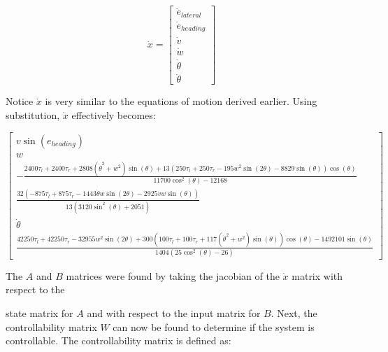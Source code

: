 \documentclass[10pt, letterbox]{article}
\begin{document}
\begin{center}
\begin{equation}
\dot{x} = 
\begin{bmatrix} 
\dot{e}_{lateral} \\ 
\dot{e}_{heading} \\ 
\dot{v}  \\ 
\dot{w}  \\ 
\dot{\theta} \\
\ddot{\theta}
\end{bmatrix} 
\end{equation}
\end{center}
Notice $\dot{x}$ is very similar to the equations of motion derived earlier. Using substitution, $\dot{x}$ effectively becomes:
\begin{center}
\begin{equation}
\begin{bmatrix}v 
\sin{\left(e_{heading} \right)}\\
w\\
- \frac{2400 \tau_{l} + 2400 \tau_{r} + 2808 \left(\dot{\theta}^{2} + w^{2}\right) \sin{\left(\theta \right)} + 13 \left(250 \tau_{l} + 250 \tau_{r} - 195 w^{2} \sin{\left(2 \theta \right)} - 8829 \sin{\left(\theta \right)}\right) \cos{\left(\theta \right)}}{11700 \cos^{2}{\left(\theta \right)} - 12168}\\
\frac{32 \left(- 875 \tau_{l} + 875 \tau_{r} - 1443 \dot{\theta} w \sin{\left(2 \theta \right)} - 2925 v w \sin{\left(\theta \right)}\right)}{13 \left(3120 \sin^{2}{\left(\theta \right)} + 2051\right)}\\
\dot{\theta}\\
\frac{42250 \tau_{l} + 42250 \tau_{r} - 32955 w^{2} \sin{\left(2 \theta \right)} + 300 \left(100 \tau_{l} + 100 \tau_{r} + 117 \left(\dot{\theta}^{2} + w^{2}\right) \sin{\left(\theta \right)}\right) \cos{\left(\theta \right)} - 1492101 \sin{\left(\theta \right)}}{1404 \left(25 \cos^{2}{\left(\theta \right)} - 26\right)}
\end{bmatrix}
\end{equation}
\end{center}
\begin{addmargin}[5em]{0em}
The $A$ and $B$ matrices were found by taking the jacobian of the $\dot{x}$ matrix with respect to the \end{addmargin} state matrix for $A$ and with respect to the input matrix for $B$. Next, the controllability matrix $W$ can now be found to determine if the system is controllable. The controllability matrix is defined as:
\end{document}
